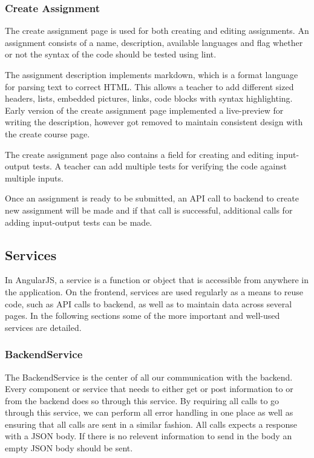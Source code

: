 \subsubsection{Create Assignment}
The create assignment page is used for both creating and editing assignments. An assignment consists of a name, description, available languages and flag whether or not the syntax of the code should be tested using lint. 

The assignment description implements markdown, which is a format language for parsing text to correct HTML. This allows a teacher to add different sized headers, lists, embedded pictures, links, code blocks with syntax highlighting. Early version of the create assignment page implemented a live-preview for writing the description, however got removed to maintain consistent design with the create course page. 

The create assignment page also contains a field for creating and editing input-output tests. A teacher can add multiple tests for verifying the code against multiple inputs.

Once an assignment is ready to be submitted, an API call to backend to create new assignment will be made and if that call is successful, additional calls for adding input-output tests can be made. 

\subsection{Services}
In AngularJS, a service is a function or object that is accessible from anywhere in the application. On the frontend, services are used regularly as a means to reuse code, such as API calls to backend, as well as to maintain data across several pages. In the following sections some of the more important and well-used services are detailed.

\subsubsection{BackendService}
The BackendService is the center of all our communication with the backend. Every component or service that needs to either get or post information to or from the backend does so through this service. By requiring all calls to go through this service, we can perform all error handling in one place as well as ensuring that all calls are sent in a similar fashion. All calls expects a response with a JSON body. If there is no relevent information to send in the body an empty JSON body should be sent.


